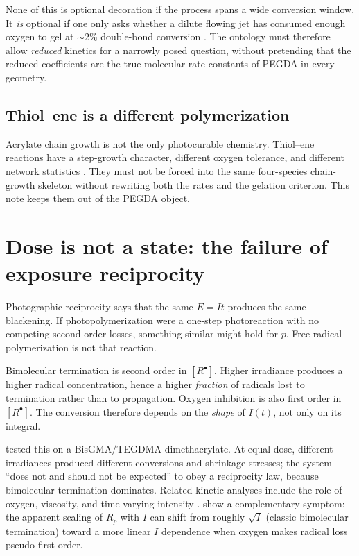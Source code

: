 \documentclass[11pt,a4paper]{article}
\begin{document}
None of this is optional decoration if the process spans a wide conversion window.
It \emph{is} optional if one only asks whether a dilute flowing jet has consumed enough oxygen to gel at $\sim 2\%$ double-bond conversion \citep{Slutzky2019}.
The ontology must therefore allow \emph{reduced} kinetics for a narrowly posed question, without pretending that the reduced coefficients are the true molecular rate constants of PEGDA in every geometry.

\subsection{Thiol--ene is a different polymerization}

Acrylate chain growth is not the only photocurable chemistry.
Thiol--ene reactions have a step-growth character, different oxygen tolerance, and different network statistics \citep{Cramer2001}.
They must not be forced into the same four-species chain-growth skeleton without rewriting both the rates and the gelation criterion.
This note keeps them out of the PEGDA object.

\section{\texorpdfstring{Dose is not a state: the failure of exposure reciprocity}{Dose is not a state: the failure of exposure reciprocity}}

Photographic reciprocity says that the same $E=It$ produces the same blackening.
If photopolymerization were a one-step photoreaction with no competing second-order losses, something similar might hold for $p$.
Free-radical polymerization is not that reaction.

Bimolecular termination is second order in $[R^\bullet]$.
Higher irradiance produces a higher radical concentration, hence a higher \emph{fraction} of radicals lost to termination rather than to propagation.
Oxygen inhibition is also first order in $[R^\bullet]$.
The conversion therefore depends on the \emph{shape} of $I(t)$, not only on its integral.

\citet{Wydra2014} tested this on a BisGMA/TEGDMA dimethacrylate.
At equal dose, different irradiances produced different conversions and shrinkage stresses; the system ``does not and should not be expected'' to obey a reciprocity law, because bimolecular termination dominates.
Related kinetic analyses include the role of oxygen, viscosity, and time-varying intensity \citep{Lin2019}.
\citet{Dobson2024} show a complementary symptom: the apparent scaling of $R_p$ with $I$ can shift from roughly $\sqrt{I}$ (classic bimolecular termination) toward a more linear $I$ dependence when oxygen makes radical loss pseudo-first-order.
\end{document}
